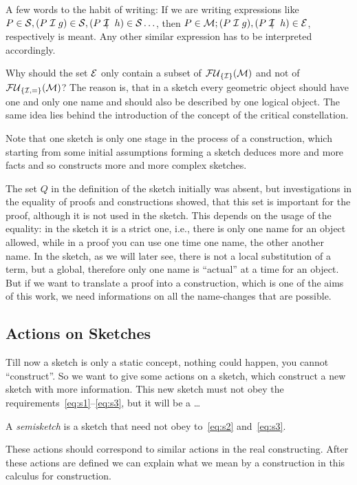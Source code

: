 A few words to the habit of writing: If we are writing
expressions like $P\in\cS, (P\cI g)\in\cS, (P\notcI h)\in \cS\ldots$,
then $P\in\cM; (P\cI g), (P\notcI h)\in \cE$,
respectively is meant. Any other similar expression has to be
interpreted accordingly.

Why should the set $\cE$ only contain a subset of $\fu_{\{\cI\}}(\cM)$
and not of $\fu_{\{\cI,=\}}(\cM)$? The reason is, that in a sketch
every geometric object should have one and only one name and should
also be described by one logical object. The same idea lies behind the
introduction of the concept of the critical constellation.

Note that one sketch is only one stage in the process of a
construction, which starting from some initial assumptions forming a
sketch deduces more and more facts and so constructs more and more
complex sketches.

The set $Q$ in the definition of the sketch initially was absent, but
investigations in the equality of proofs and constructions showed,
that this set is important for the proof, although it is not used in
the sketch. This depends on the usage of the equality: in the sketch it is
a strict one, i.e., there is only one name for an object allowed,
while in a proof you can use one time one name, the other another
name. In the sketch, as we will later see, there is not a local
substitution of a term, but a global, therefore only one name is
``actual'' at a time for an object. But if we want to translate a
proof into a construction, which is one of the aims of this work, we
need informations on all the name-changes that are possible.

%
%
\subsection{Actions on Sketches\label{:sketch:actions}}
Till now a sketch is only a static concept, nothing could happen, you
cannot ``construct''. So we want to give some actions on a sketch,
which construct a new sketch with more information. This new sketch
must not obey the requirements~\ref{eq:s1}--\ref{eq:s3}, but it will
be a \ldots

\begin{definition}[Semisketch] A \emph{semisketch} is a sketch that
need not obey to~\ref{eq:s2} and~\ref{eq:s3}.
\end{definition}

These actions should correspond to similar actions in the real
constructing. After 
these actions are defined we can explain what we mean by a
construction in this calculus for construction.


